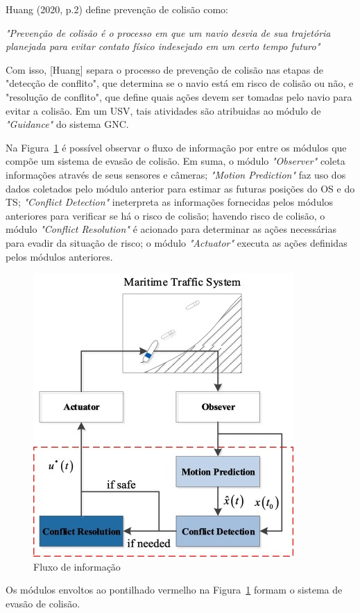         Huang (2020, p.2) define prevenção de colisão como:
        \begin{directcite}
            \textit{"Prevenção de colisão é o processo em que um navio desvia de sua trajetória planejada para evitar contato físico indesejado em um certo tempo futuro"}
        \end{directcite}
        
        Com isso, [Huang] separa o processo de prevenção de colisão nas etapas de "detecção de conflito", que determina se o navio está em risco de colisão ou não, e "resolução de conflito", que define quais ações devem ser tomadas pelo navio para evitar a colisão. Em um USV, tais atividades são atribuidas ao módulo de \textit{"Guidance"} do sistema GNC.~\cite{HUANG2020451}
        
        Na Figura~\ref{fig:col_avoid_info_flow} é possível observar o fluxo de informação por entre os módulos que compõe um sistema de evasão de colisão. Em suma, o módulo \textit{"Observer"} coleta informações através de seus sensores e câmeras; \textit{"Motion Prediction"} faz uso dos dados coletados pelo módulo anterior para estimar as futuras posições do OS e do TS; \textit{"Conflict Detection"} ineterpreta as informações fornecidas pelos módulos anteriores para verificar se há o risco de colisão; havendo risco de colisão, o módulo \textit{"Conflict Resolution"} é acionado para determinar as ações necessárias para evadir da situação de risco; o módulo \textit{"Actuator"} executa as ações definidas pelos módulos anteriores.~\cite{HUANG2020451}
        
        \begin{figure}
            \centering
            \includegraphics{fig/information_flow.png}
            \caption{Fluxo de informação ~\cite{HUANG2020451}}
            \label{fig:col_avoid_info_flow}
        \end{figure}
        
        Os módulos envoltos ao pontilhado vermelho na Figura~\ref{fig:col_avoid_info_flow} formam o sistema de evasão de colisão. 